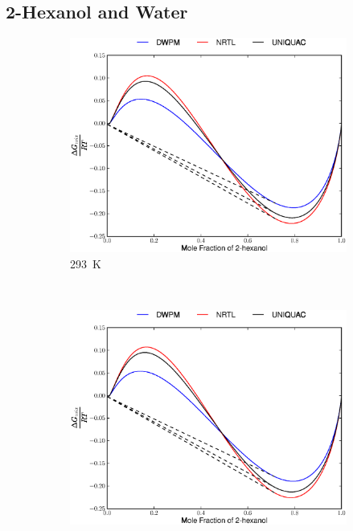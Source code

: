 \subsection{2-Hexanol and Water}
\begin{figure}[hp]
\begin{subfigure}[h]{0.5\textwidth}
	\centering
	\includegraphics[width = \textwidth]{Results_Parts/BinaryParams/2-hexanol-water/AllModelsGibbsPlots/T_293.eps}
	\caption{293~$\mathrm{K}$} 
\end{subfigure}%
~%
\begin{subfigure}[h]{0.5\textwidth}
	\centering
	\includegraphics[width = \textwidth]{Results_Parts/BinaryParams/2-hexanol-water/AllModelsGibbsPlots/T_298.eps}

\end{subfigure}
\end{figure}
